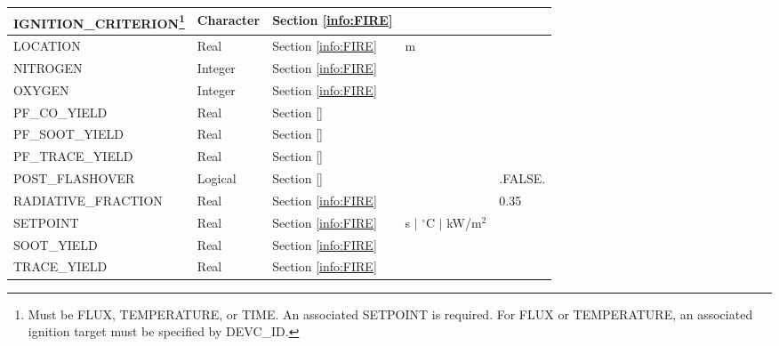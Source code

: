 \begin{minipage}{6.5in}
\begin{longtable}{@{\extracolsep{\fill}}|l|l|l|l|l|}
{\ct IGNITION\_CRITERION}\footnote{Must be {\ct FLUX}, {\ct TEMPERATURE}, or {\ct TIME}. An associated {\ct SETPOINT} is required. For {\ct FLUX} or {\ct TEMPERATURE}, an associated ignition target must be specified by {\ct DEVC\_ID}.}
                           & Character   & Section \ref{info:FIRE}                 &                             &                 \\ \hline
{\ct LOCATION}             & Real        & Section \ref{info:FIRE}                 & m                           &                 \\ \hline
{\ct NITROGEN}             & Integer     & Section \ref{info:FIRE}                 &                             &                 \\ \hline
{\ct OXYGEN}               & Integer     & Section \ref{info:FIRE}                 &                             &                 \\ \hline
{\ct PF\_CO\_YIELD}        & Real        & Section \ref{}                 &                             &                 \\ \hline
{\ct PF\_SOOT\_YIELD}      & Real        & Section \ref{}                 &                             &                 \\ \hline
{\ct PF\_TRACE\_YIELD}     & Real        & Section \ref{}                 &                             &                 \\ \hline
{\ct POST\_FLASHOVER}      & Logical     & Section \ref{}                 &                             &    {\ct .FALSE.}    \\ \hline
{\ct RADIATIVE\_FRACTION}  & Real        & Section \ref{info:FIRE}                 &                             &     0.35        \\ \hline
{\ct SETPOINT}             & Real        & Section \ref{info:FIRE}                 & s $\mid$ $^\circ$C $\mid$ kW/m$^2$  &                 \\ \hline
{\ct SOOT\_YIELD}          & Real        & Section \ref{info:FIRE}                 &                             &                 \\ \hline
{\ct TRACE\_YIELD}         & Real        & Section \ref{info:FIRE}                 &                             &                 \\ \hline
\end{longtable}
\end{minipage}


